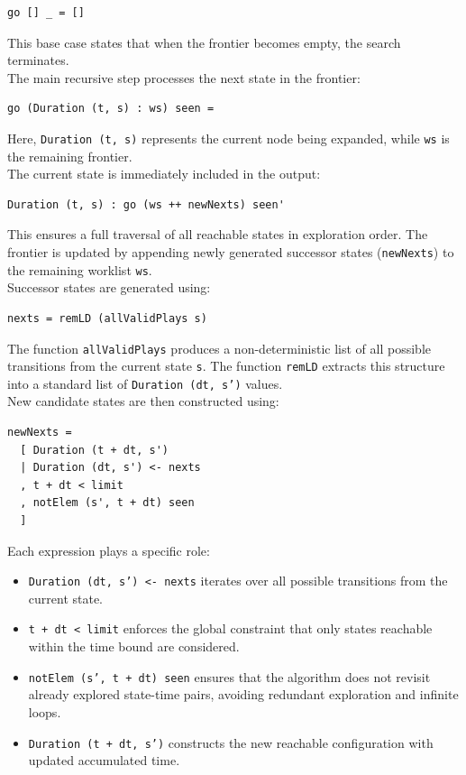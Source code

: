 \documentclass[a4paper,12pt]{report}
\begin{document}
\begin{verbatim}
go [] _ = []
\end{verbatim}
This base case states that when the frontier becomes empty, the search terminates.
\\[1em]
The main recursive step processes the next state in the frontier:
\begin{verbatim}
go (Duration (t, s) : ws) seen =
\end{verbatim}
Here, \texttt{Duration (t, s)} represents the current node being expanded,
while \texttt{ws} is the remaining frontier.
\\[1em]
The current state is immediately included in the output:
\begin{verbatim}
Duration (t, s) : go (ws ++ newNexts) seen'
\end{verbatim}
This ensures a full traversal of all reachable states in exploration order.
The frontier is updated by appending newly generated successor states
(\texttt{newNexts}) to the remaining worklist \texttt{ws}.
\\[1em]
Successor states are generated using:
\begin{verbatim}
nexts = remLD (allValidPlays s)
\end{verbatim}
The function \texttt{allValidPlays} produces a non-deterministic list of all
possible transitions from the current state \texttt{s}. The function
\texttt{remLD} extracts this structure into a standard list of
\texttt{Duration (dt, s')} values.
\\[1em]
New candidate states are then constructed using:
\begin{verbatim}
newNexts =
  [ Duration (t + dt, s')
  | Duration (dt, s') <- nexts
  , t + dt < limit
  , notElem (s', t + dt) seen
  ]
\end{verbatim}
Each expression plays a specific role:
\begin{itemize}
\item \texttt{Duration (dt, s') <- nexts} iterates over all possible transitions
from the current state.
\item \texttt{t + dt < limit} enforces the global constraint that only states
reachable within the time bound are considered.
\item \texttt{notElem (s', t + dt) seen} ensures that the algorithm does
not revisit already explored state-time pairs, avoiding redundant exploration
and infinite loops.
\item \texttt{Duration (t + dt, s')} constructs the new reachable configuration
with updated accumulated time.
\end{itemize}
\end{document}
